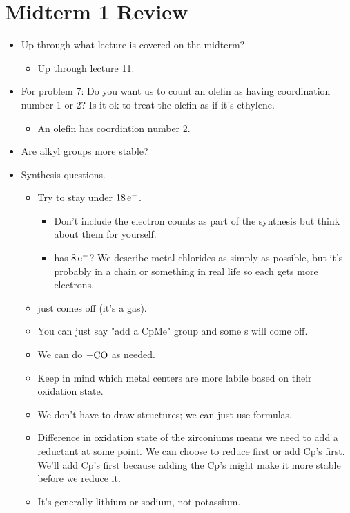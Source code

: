 \documentclass[../notes.tex]{subfiles}
\begin{document}
\section{Midterm 1 Review}
\begin{itemize}
    \item {}Up through what lecture is covered on the midterm?
    \begin{itemize}
        \item Up through lecture 11.
    \end{itemize}
    \item For problem 7: Do you want us to count an olefin as having coordination number 1 or 2? Is it ok to treat the olefin as if it's ethylene.
    \begin{itemize}
        \item An olefin has coordintion number 2.
    \end{itemize}
    \item Are alkyl groups more stable?
    \item Synthesis questions.
    \begin{itemize}
        \item Try to stay under $18\,\e[-]$.
        \begin{itemize}
            \item Don't include the electron counts as part of the synthesis but think about them for yourself.
            \item {} has $8\,\e[-]$? We describe metal chlorides as simply as possible, but it's probably in a chain or something in real life so each  gets more electrons.
        \end{itemize}
        \item {} just comes off (it's a gas).
        \item You can just say "add a CpMe" group and some s will come off.
        \item We can do $-\ce{CO}$ as needed.
        \item Keep in mind which metal centers are more labile based on their oxidation state.
        \item We don't have to draw structures; we can just use formulas.
        \item Difference in oxidation state of the zirconiums means we need to add a reductant at some point. We can choose to reduce first or add Cp's first. We'll add Cp's first because adding the Cp's might make it more stable before we reduce it.
        \item It's generally lithium or sodium, not potassium.

\end{itemize}
\end{itemize}
\end{document}
